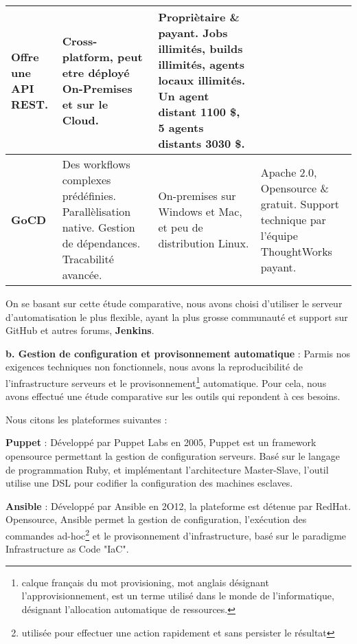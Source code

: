 \begin{spacing}{1.2}
\begin{table}[ht]
\begin{tabularx}{\textwidth}{|p{1.4cm}|X|X|X|}
          Offre une API REST.
          &
          Cross-platform, peut etre déployé On-Premises et sur le Cloud.
          &
          Propriètaire \& payant.
           Jobs illimités, builds illimités, agents locaux illimités. Un agent distant 1100 \$, 5 agents distants 3030 \$.
          \\
          \hline
          \textbf{GoCD}
          &
          Des workflows complexes prédéfinies. 
          Parallèlisation native. 
          Gestion de dépendances.
          Tracabilité avancée. 
          &
          On-premises sur Windows et Mac, et peu de distribution Linux.
          &
          Apache 2.0, Opensource \& gratuit.
          Support technique par l'équipe ThoughtWorks payant.
          \\
          \hline
        \end{tabularx}
	\label{tab:exple}
\end{table}
\FloatBarrier
On se basant sur cette étude comparative, nous avons choisi d'utiliser le serveur d'automatisation le plus flexible, ayant la plus grosse communauté et support sur GitHub et autres forums, \textbf{Jenkins}.
\vspace{2mm}

\textbf{b. Gestion de configuration et provisonnement automatique} : 
Parmis nos exigences techniques non fonctionnels, nous avons la reproducibilité de l'infrastructure serveurs et le provisonnement\footnote{calque français du mot provisioning, mot anglais désignant l'approvisionnement, est un terme utilisé dans le monde de l'informatique, désignant l'allocation automatique de ressources.} automatique. Pour cela, nous avons effectué une étude comparative sur les outils qui repondent à ces besoins. 

Nous citons les plateformes suivantes : 

\textbf{Puppet} : Développé par Puppet Labs en 2005, Puppet est un framework opensource permettant la gestion de configuration serveurs. Basé sur le langage de programmation Ruby, et implémentant l'architecture Master-Slave, l'outil utilise une DSL pour codifier la configuration des machines esclaves.

\textbf{Ansible} : Développé par Ansible en 2O12,
la plateforme est détenue par RedHat. Opensource, Ansible permet la gestion de configuration, l'exécution des commandes ad-hoc\footnote{utilisée pour effectuer une action rapidement et sans persister le résultat} et le provisonnement d'infrastructure, basé sur le paradigme Infrastructure as Code "IaC". 


\end{spacing}
